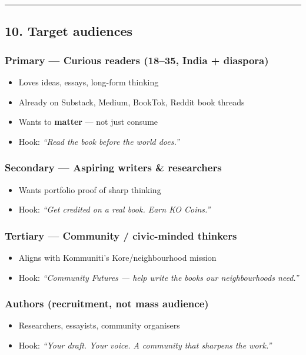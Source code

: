\documentclass[11pt,a4paper]{report}
\begin{document}
\medskip\hrule\medskip

\subsection{10. Target audiences}

\subsubsection{Primary --- Curious readers (18--35, India + diaspora)}
\begin{itemize}
  \item Loves ideas, essays, long-form thinking
  \item Already on Substack, Medium, BookTok, Reddit book threads
  \item Wants to \textbf{matter} --- not just consume
  \item Hook: \textit{“Read the book before the world does.”}
\end{itemize}

\subsubsection{Secondary --- Aspiring writers \& researchers}
\begin{itemize}
  \item Wants portfolio proof of sharp thinking
  \item Hook: \textit{“Get credited on a real book. Earn KO Coins.”}
\end{itemize}

\subsubsection{Tertiary --- Community / civic-minded thinkers}
\begin{itemize}
  \item Aligns with Kommuniti’s Kore/neighbourhood mission
  \item Hook: \textit{“Community Futures --- help write the books our neighbourhoods need.”}
\end{itemize}

\subsubsection{Authors (recruitment, not mass audience)}
\begin{itemize}
  \item Researchers, essayists, community organisers
  \item Hook: \textit{“Your draft. Your voice. A community that sharpens the work.”}
\end{itemize}
\end{document}
